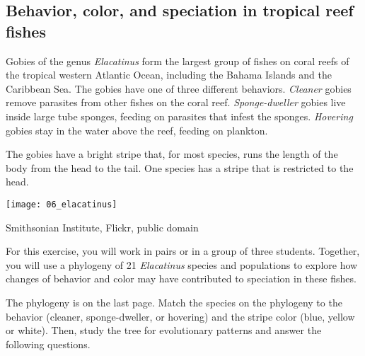 \documentclass[12pt, hidelinks]{exam}
\begin{document}
\subsection*{Behavior, color, and speciation in tropical reef fishes}

Gobies of the genus \textit{Elacatinus} form the largest group of fishes on
coral reefs of the tropical western Atlantic Ocean, including the Bahama Islands
and the Caribbean Sea. The gobies have one of three different behaviors. \emph{Cleaner} gobies
remove parasites from other fishes on the coral reef. \emph{Sponge-dweller} gobies
live inside large tube sponges, feeding on parasites that infest the sponges. \emph{Hovering} gobies
stay in the water above the reef, feeding on plankton.

The gobies have a bright stripe that, for most species, runs the length of the body
from the head to the tail. One species has a stripe that is restricted to the head.

\begin{center}
	\texttt{[image: 06\_elacatinus]}

	{\footnotesize
	Smithsonian Institute, Flickr, public domain}
\end{center}

For this exercise, you will work in pairs or in a group of three students. Together,
 you will use a phylogeny of 21 \textit{Elacatinus} species and
populations to explore how changes of behavior and color may have
contributed to speciation in these fishes.

The phylogeny is on the last page. Match the species on the phylogeny
 to the behavior (cleaner, sponge-dweller, or hovering) and the stripe color 
 (blue, yellow or white). Then, study the tree for evolutionary patterns and
  answer the following questions.
\end{document}
